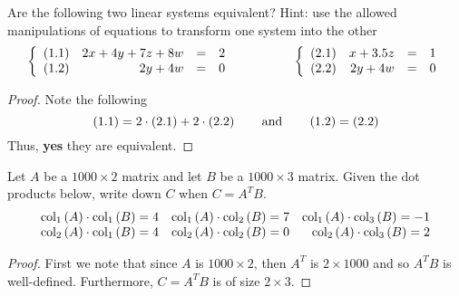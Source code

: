 \documentclass{tutorial}
\begin{document}
\vspace{0.1in}

\begin{prob}
Are the following two linear systems equivalent? Hint: use the allowed manipulations of equations to transform one system into the other
\[
	\lb \begin{array}{lrcl}
		\text{(1.1)}	& 2x+4y+7z+8w & = & 2 \\
		\text{(1.2)}	&2y+4w & = & 0
	\end{array} \right.
	\hspace{0.65in}
	\lb \begin{array}{lrcl}
		\text{(2.1)}	&x+3.5z& = & 1 \\
		\text{(2.2)}	&2y+4w & = & 0		
	\end{array} \right.
\]
\end{prob} \ifsolns \begin{proof}
Note the following
\[
	(1.1) = 2 \cdot (2.1) + 2 \cdot (2.2)
	\hspace{0.3in} \text{and} \hspace{0.3in}
	(1.2) = (2.2)
\]
Thus, \textbf{yes} they are equivalent.
\end{proof}\else \vspace{1.5in} \fi


\begin{prob}
Let $A$ be a $1000 \times 2$ matrix and let $B$ be a $1000 \times 3$ matrix. Given the dot products below, write down $C$ when $C=A^{T}B$.
\[
	\begin{array}{rrr}
		\col{A}{1} \cdot \col{B}{1} = 4
	&	\col{A}{1} \cdot \col{B}{2} = 7
	&	\col{A}{1} \cdot \col{B}{3} = -1 \\
		\col{A}{2} \cdot \col{B}{1} = 4
	&	\col{A}{2} \cdot \col{B}{2} = 0
	&	\col{A}{2} \cdot \col{B}{3} = 2
	\end{array}
\]
\end{prob} \ifsolns \begin{proof}
First we note that since $A$ is $1000 \times 2$, then $A^T$ is $2 \times 1000$ and so $A^TB$ is well-defined. Furthermore, $C=A^TB$ is of size $2 \times 3$.
\end{proof}\else \newpage \fi
\end{document}
